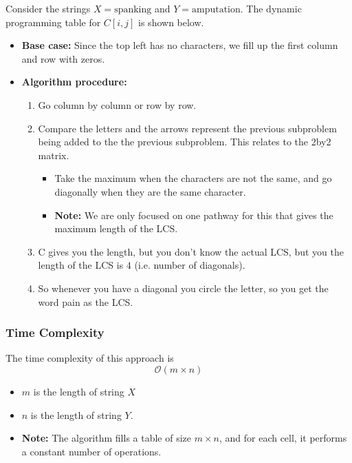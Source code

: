 \begin{example}
Consider the strings \(X = \text{spanking}\) and \(Y = \text{amputation}\). The dynamic programming table for \(C[i,j]\) is shown below.

\begin{itemize}
    \item \textbf{Base case:} Since the top left has no characters, we fill up the first column and row with zeros. 
    \item \textbf{Algorithm procedure:} 
    \begin{enumerate}
        \item Go column by column or row by row. 
        \item Compare the letters and the arrows represent the previous subproblem being added to the the previous subproblem. This relates to the 2by2 matrix. 
        \begin{itemize}
            \item Take the maximum when the characters are not the same, and go diagonally when they are the same character.
            \item \textbf{Note:} We are only focused on one pathway for this that gives the maximum length of the LCS. 
        \end{itemize}
        \item C gives you the length, but you don't know the actual LCS, but you the length of the LCS is $4$ (i.e. number of diagonals). 
        \item So whenever you have a diagonal you circle the letter, so you get the word pain as the LCS.
    \end{enumerate}
\end{itemize}

\end{example}

\subsubsection{Time Complexity}
\begin{definition}
    The time complexity of this approach is 
    \begin{equation}
        \mathcal{O}(m \times n)
    \end{equation}
    \begin{itemize}
        \item \(m\) is the length of string \(X\)
        \item \(n\) is the length of string \(Y\). 
        \item \textbf{Note:} The algorithm fills a table of size \(m \times n\), and for each cell, it performs a constant number of operations.
    \end{itemize}
\end{definition}